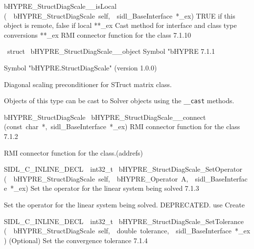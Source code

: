 \documentclass{article}
\begin{document}
\begin{cxxentry}
\begin{cxxentry}
\begin{cxxnames}
        {}
\label{cxx.7.1.34}
        {bHYPRE\_StructDiagScale\_\_isLocal}
        {(\ \ bHYPRE\_StructDiagScale\ self,\ \ sidl\_BaseInterface\ *\_ex)}
        {
TRUE if this object is remote, false if local}
        {}
\label{cxx.7.1.35}
        {**\_ex}
        {}
        {
Cast method for interface and class type conversions}
        {}
\label{cxx.7.1.36}
        {**\_ex}
        {}
        {
RMI connector function for the class}
        {7.1.10}
\end{cxxnames}
\begin{cxxvariable}
{\ struct\ }
        {bHYPRE\_StructDiagScale\_\_object}
        {}
        {
Symbol "bHYPRE}
        {7.1.1}
\begin{cxxdoc}

Symbol "bHYPRE.StructDiagScale" (version 1.0.0)

Diagonal scaling preconditioner for STruct matrix class.

Objects of this type can be cast to Solver objects using the
{\tt \_\_cast} methods.
\end{cxxdoc}
\end{cxxvariable}
\begin{cxxfunction}
{bHYPRE\_StructDiagScale\ }
        {bHYPRE\_StructDiagScale\_\_connect}
        {(const\ char\ *,\ sidl\_BaseInterface\ *\_ex)}
        {
RMI connector function for the class}
        {7.1.2}
\begin{cxxdoc}

RMI connector function for the class.(addrefs)
\end{cxxdoc}
\end{cxxfunction}
\begin{cxxfunction}
{SIDL\_C\_INLINE\_DECL\ \ int32\_t\ }
        {bHYPRE\_StructDiagScale\_SetOperator}
        {(\ \ bHYPRE\_StructDiagScale\ self,\ \ bHYPRE\_Operator\ A,\ \ sidl\_BaseInterface\ *\_ex)}
        {
Set the operator for the linear system being solved}
        {7.1.3}
\begin{cxxdoc}

Set the operator for the linear system being solved.
DEPRECATED.  use Create
\end{cxxdoc}
\end{cxxfunction}
\begin{cxxfunction}
{SIDL\_C\_INLINE\_DECL\ \ int32\_t\ }
        {bHYPRE\_StructDiagScale\_SetTolerance}
        {(\ \ bHYPRE\_StructDiagScale\ self,\ \ double\ tolerance,\ \ sidl\_BaseInterface\ *\_ex)}
        {
(Optional) Set the convergence tolerance}
        {7.1.4}
\begin{cxxdoc}


\end{cxxdoc}
\end{cxxfunction}
\end{cxxentry}
\end{cxxentry}
\end{document}

